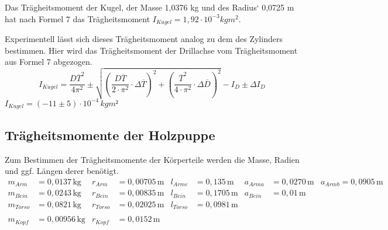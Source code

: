 \documentclass[titlepage = firstcover]{scrartcl}
\begin{document}
      Das Trägheitsmoment der Kugel, der Masse 1,0376 kg und des Radius` 0,0725 m hat nach Formel 7 das Trägheitsmoment $I_{Kugel} = 1,92 \cdot 10^{-3} kgm^2$. \newline

      Experimentell lässt sich dieses Trägheitsmoment analog zu dem des Zylinders bestimmen. Hier wird das Trägheitsmoment der Drillachse vom Trägheitsmoment
      aus Formel 7 abgezogen.
      \begin{equation*}
        I_{Kugel} = \frac{D\overline{T}^2}{4\pi^2} \pm \sqrt{(\frac{D\overline{T}}{2\cdot \pi^2} \cdot \Delta \overline{T})^2 + (\frac{\overline{T}^2}{4 \cdot \pi^2} \cdot \Delta \overline{D})^2} - I_D \pm \Delta I_D
      \end{equation*}
      $I_{Kugel} = (-11 \pm 5) \cdot 10^{-4} \, kgm²$
      


      \subsection{Trägheitsmomente der Holzpuppe}

      
      Zum Bestimmen der Trägheitsmomente der Körperteile werden die Masse, Radien und ggf. Längen derer benötigt.
      \begin{align*}
        m_{Arm} &= 0,0137 \, \text{kg} & r_{Arm} &= 0,00705 \, \text{m} & l_{Arme} &= 0,135 \, \text{m} & a_{Arma} &= 0,0270 \, \text{m} & a_{Armb} = 0,0905 \, \text{m} \\
        m_{Bein} &= 0,0243 \, \text{kg} & r_{Bein} &= 0,00835 \, \text{m} & l_{Bein} &= 0,1705 \, \text{m} & a_{Bein} &= 0,01 \, \text{m} & \\
        m_{Torso} &= 0,0821 \, \text{kg} &  r_{Torso} &= 0,02025 \, \text{m} & l_{Torso} &= 0,0981 \, \text{m} & \\ & \\
        m_{Kopf} &= 0,00956 \, \text{kg} & r_{Kopf} &= 0,0152 \, \text{m} & \\ & \\ &
      \end{align*}
\end{document}
